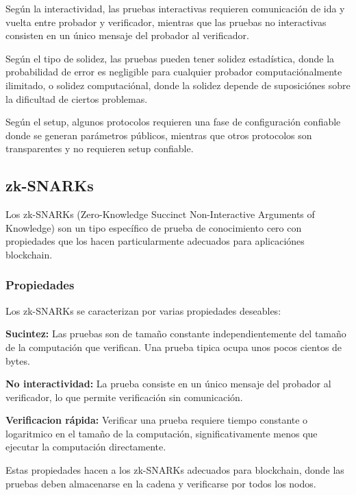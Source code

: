 \documentclass[12pt,a4paper,twoside]{book}
\begin{document}
Según la interactividad, las pruebas interactivas requieren comunicación de ida y vuelta entre probador y verificador, mientras que las pruebas no interactivas consisten en un único mensaje del probador al verificador.

Según el tipo de solidez, las pruebas pueden tener solidez estadística, donde la probabilidad de error es negligible para cualquier probador computaciónalmente ilimitado, o solidez computaciónal, donde la solidez depende de suposiciónes sobre la dificultad de ciertos problemas.

Según el setup, algunos protocolos requieren una fase de configuración confiable donde se generan parámetros públicos, mientras que otros protocolos son transparentes y no requieren setup confiable.

\subsection{zk-SNARKs}

Los zk-SNARKs (Zero-Knowledge Succinct Non-Interactive Arguments of Knowledge) son un tipo específico de prueba de conocimiento cero con propiedades que los hacen particularmente adecuados para aplicaciónes blockchain.

\subsubsection{Propiedades}

Los zk-SNARKs se caracterizan por varias propiedades deseables:

\textbf{Sucintez:} Las pruebas son de tamaño constante independientemente del tamaño de la computación que verifican. Una prueba tipica ocupa unos pocos cientos de bytes.

\textbf{No interactividad:} La prueba consiste en un único mensaje del probador al verificador, lo que permite verificación sin comunicación.

\textbf{Verificacion rápida:} Verificar una prueba requiere tiempo constante o logaritmico en el tamaño de la computación, significativamente menos que ejecutar la computación directamente.

Estas propiedades hacen a los zk-SNARKs adecuados para blockchain, donde las pruebas deben almacenarse en la cadena y verificarse por todos los nodos.
\end{document}
